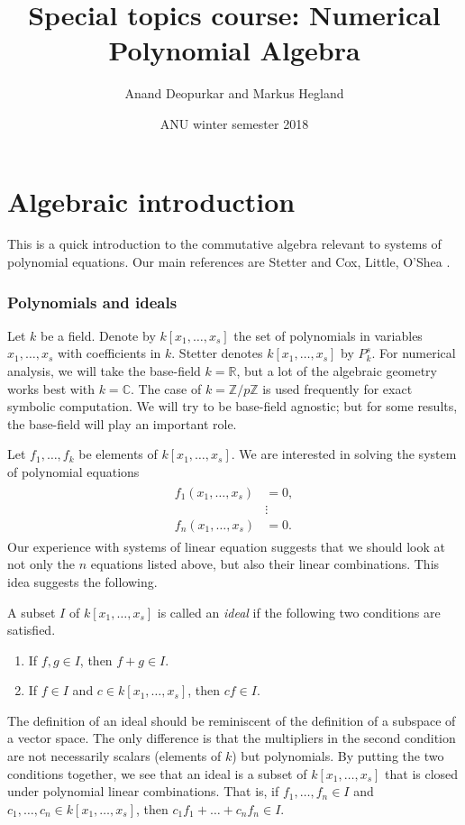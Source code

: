 \documentclass[11pt]{article}
\title{Special topics course: Numerical Polynomial Algebra}
\author{Anand Deopurkar and Markus Hegland}
\date{ANU winter semester 2018}
\newcommand{\C}{\mathbb C}
\newcommand{\Z}{\mathbb Z}
\newcommand{\R}{\mathbb R}
\begin{document}
\maketitle

\part*{Algebraic introduction}
This is a quick introduction to the commutative algebra relevant to systems of polynomial equations.
Our main references are Stetter \cite{stetter04} and Cox, Little, O'Shea \cite{cox15}.

\tableofcontents

\section{Polynomials and ideals}

Let $k$ be a field.
Denote by $k[x_1,\dots,x_s]$ the set of polynomials in variables $x_1, \dots, x_s$ with coefficients in $k$. 
Stetter denotes $k[x_1,\dots,x_s]$ by $P^s_k$.
For numerical analysis, we will take the base-field $k = \R$, but a lot of the algebraic geometry works best with $k = \C$.
The case of $k = \Z/p\Z$ is used frequently for exact symbolic computation.
We will try to be base-field agnostic; but for some results, the base-field will play an important role. 

Let $f_1, \dots, f_k$ be elements of $k[x_1,\dots, x_s]$.
We are interested in solving the system of polynomial equations
\begin{align}\label{eqn:system}
  \begin{split}
  f_1(x_1, \dots, x_s) &= 0,\\
  &\vdots\\
  f_n(x_1, \dots, x_s) &= 0.
\end{split}
\end{align}
Our experience with systems of linear equation suggests that we should look at not only the $n$ equations listed above, but also their linear combinations.
This idea suggests the following.
\begin{definition}[Ideal]
  A subset $I$ of $k[x_1, \dots, x_s]$ is called an \emph{ideal} if the following two conditions are satisfied.
  \begin{enumerate}
  \item If $f, g \in I$, then $f+g \in I$.
  \item If $f \in I$ and $c \in k[x_1, \dots, x_s]$, then $cf \in I$.
  \end{enumerate}
\end{definition}
The definition of an ideal should be reminiscent of the definition of a subspace of a vector space.
The only difference is that the multipliers in the second condition are not necessarily scalars (elements of $k$) but polynomials.
By putting the two conditions together, we see that an ideal is a subset of $k[x_1, \dots, x_s]$ that is closed under polynomial linear combinations.
That is, if $f_1, \dots, f_n \in I$ and $c_1, \dots, c_n \in k[x_1, \dots, x_s]$, then $c_1f_1 + \dots + c_nf_n \in I$.
\end{document}
